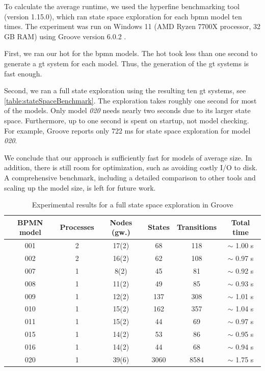 \documentclass{lmcs} %
\theoremstyle{plain}\newtheorem{satz}[thm]{Satz} %
\begin{document}
To calculate the average runtime, we used the hyperfine benchmarking tool \cite{peterHyperfine2022} (version 1.15.0), which ran state space exploration for each \gls*{bpmn} model ten times.
The experiment was run on Windows 11 (AMD Ryzen 7700X processor, 32 GB RAM) using Groove version 6.0.2 \cite{krauterArtifactsLMCS2023}.

First, we ran our \gls*{hot} for the \gls*{bpmn} models.
The \gls*{hot} took less than one second to generate a \gls*{gt} system for each model.
Thus, the generation of the \gls*{gt} systems is fast enough.

Second, we ran a full state exploration using the resulting ten \gls*{gt} systems, see \autoref{table:stateSpaceBenchmark}.
The exploration takes roughly one second for most of the models.
Only model \textit{020} needs nearly two seconds due to its larger state space.
Furthermore, up to one second is spent on startup, not model checking.
For example, Groove reports only 722 ms for state space exploration for model \textit{020}.

We conclude that our approach is sufficiently fast for models of average size.
In addition, there is still room for optimization, such as avoiding costly I/O to disk.
A comprehensive benchmark, including a detailed comparison to other tools and scaling up the model size, is left for future work.

\begin{table}[ht]
\centering
\caption[Experimental results for a full state space exploration in Groove]{Experimental results for a full state space exploration in Groove}

\begin{tabular}{| c | c | c || c | c | c |}
 \hline
 BPMN model & Processes & Nodes (gw.) & States & Transitions & Total time \\
 \hline\hline
 001 & 2 & 17(2) & 68 & 118 & $\sim$ 1.00 s \\
 \hline
 002 & 2 & 16(2) & 62 & 108 & $\sim$ 0.97 s \\
 \hline
 007 & 1 & 8(2) & 45 & 81 & $\sim$ 0.92 s \\
 \hline
 008 & 1 & 11(2) & 49 & 85 & $\sim$ 0.93 s \\
 \hline
 009 & 1 & 12(2) & 137 & 308 & $\sim$ 1.01 s \\
 \hline
 010 & 1 & 15(2) & 162 & 357 & $\sim$ 1.04 s \\
 \hline
 011 & 1 & 15(2) & 44 & 69 & $\sim$ 0.97 s \\
 \hline
 015 & 1 & 14(2) & 53 & 86 & $\sim$ 0.95 s \\
 \hline
 016 & 1 & 14(2) & 44 & 68 & $\sim$ 0.94 s \\
 \hline
 020 & 1 & 39(6) & 3060 & 8584 & $\sim$ 1.75 s \\
 \hline
\end{tabular}
\label{table:stateSpaceBenchmark}
\end{table}
\end{document}
